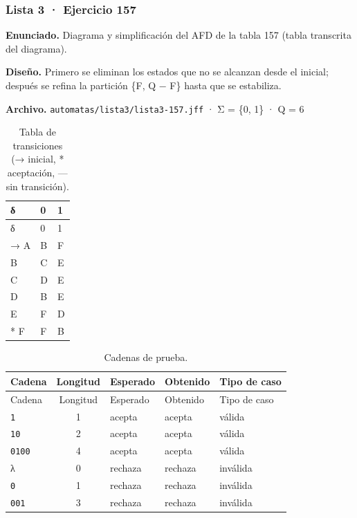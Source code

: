 
\hypertarget{lista-3-ejercicio-157}{%
\subsubsection{Lista 3 · Ejercicio 157}\label{lista-3-ejercicio-157}}

\textbf{Enunciado.} Diagrama y simplificación del AFD de la tabla 157 (tabla transcrita del diagrama).

\textbf{Diseño.} Primero se eliminan los estados que no se alcanzan desde el inicial; después se refina la partición \{F, Q − F\} hasta que se estabiliza.

\textbf{Archivo.} \texttt{automatas/lista3/lista3-157.jff} · Σ = \{0, 1\} · \textbar Q\textbar{} = 6

\begin{longtable}[]{@{}lll@{}}
\caption{Tabla de transiciones (→ inicial, * aceptación, --- sin transición).}\tabularnewline
\toprule\noalign{}
δ & 0 & 1 \\
\midrule\noalign{}
\endfirsthead
\toprule\noalign{}
δ & 0 & 1 \\
\midrule\noalign{}
\endhead
\bottomrule\noalign{}
\endlastfoot
→ A & B & F \\
B & C & E \\
C & D & E \\
D & B & E \\
E & F & D \\
* F & F & B \\
\end{longtable}

\begin{longtable}[]{@{}lclll@{}}
\caption{Cadenas de prueba.}\tabularnewline
\toprule\noalign{}
Cadena & Longitud & Esperado & Obtenido & Tipo de caso \\
\midrule\noalign{}
\endfirsthead
\toprule\noalign{}
Cadena & Longitud & Esperado & Obtenido & Tipo de caso \\
\midrule\noalign{}
\endhead
\bottomrule\noalign{}
\endlastfoot
\texttt{1} & 1 & acepta & acepta & válida \\
\texttt{10} & 2 & acepta & acepta & válida \\
\texttt{0100} & 4 & acepta & acepta & válida \\
λ & 0 & rechaza & rechaza & inválida \\
\texttt{0} & 1 & rechaza & rechaza & inválida \\
\texttt{001} & 3 & rechaza & rechaza & inválida \\
\end{longtable}

